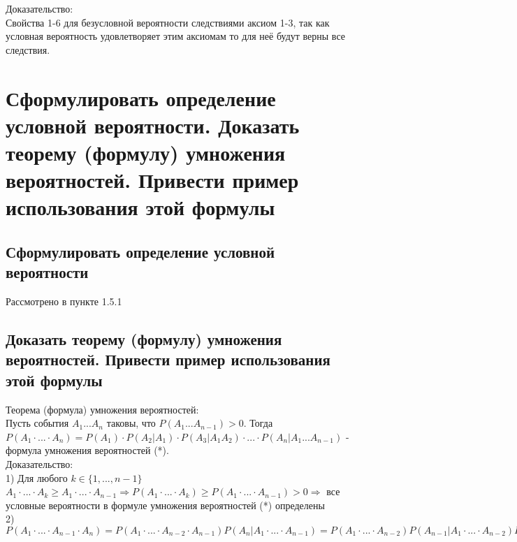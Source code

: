 Доказательство:\\
Свойства 1-6 для безусловной вероятности следствиями аксиом 1-3, так как условная вероятность удовлетворяет этим аксиомам то для неё будут верны все следствия.

\section{Сформулировать определение условной вероятности. Доказать теорему (формулу) умножения вероятностей. Привести пример использования этой формулы}

\subsection{Сформулировать определение условной вероятности}
Рассмотрено в пункте 1.5.1

\subsection{Доказать теорему (формулу) умножения вероятностей. Привести пример использования этой формулы}
Теорема (формула) умножения вероятностей:\\
Пусть события $A_{1} ... A_{n}$ таковы, что $P(A_{1} ... A_{n - 1}) > 0$. Тогда $P(A_{1} \cdot ... \cdot A_{n}) = P(A_{1}) \cdot P(A_{2} | A_{1}) \cdot P(A_{3} | A_{1} A_{2}) \cdot ... \cdot P(A_{n}|A_{1} ... A_{n-1})$ - формула умножения вероятностей (*).\\

Доказательство:\\
1) Для любого $k \in \{1, ..., n - 1\}$  $ A_{1} \cdot ... \cdot A_{k} \geqslant A_{1} \cdot ... \cdot A_{n-1} \Rightarrow P(A_{1} \cdot ... \cdot A_{k}) \geqslant P(A_{1} \cdot ... \cdot A_{n-1}) > 0 \Rightarrow $ все условные вероятности в формуле умножения вероятностей (*) определены\\
2) $P(A_{1} \cdot ... \cdot A_{n-1} \cdot A_{n}) = P(A_{1} \cdot ... \cdot A_{n-2} \cdot A_{n-1})P(A_{n} | A_{1} \cdot ... \cdot A_{n-1}) = P(A_{1} \cdot ... \cdot A_{n-2})P(A_{n-1} | A_{1} \cdot ... \cdot A_{n-2})P(A_{n}|A_{1} ... A_{n-1}) = ... = P(A_{1})P(A_{2} | A_{1}) \cdot ... \cdot P(A_{n} | A_{1} \cdot ... \cdot A_{n-1})$\\

